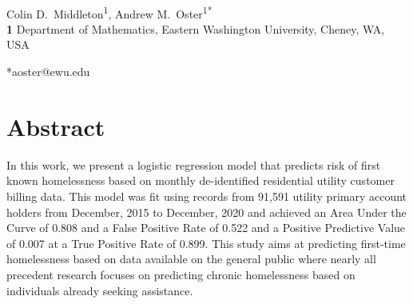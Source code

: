 \documentclass[10pt,letterpaper]{article}
\begin{document}
\vspace*{0.2in}

\begin{flushleft}
{\Large
\textbf{} %
}
\newline
\\
Colin D.\ Middleton\textsuperscript{1},
Andrew M.\ Oster\textsuperscript{1*} \\
\bigskip
\textbf{1} Department of Mathematics, Eastern Washington University, Cheney, WA, USA
\\

\bigskip





*aoster@ewu.edu

\end{flushleft}
\section*{Abstract}
In this work, we present a logistic regression model that predicts risk of first known homelessness based on monthly de-identified residential utility customer billing data. This model was fit using records from 91,591 utility primary account holders from December, 2015 to December, 2020 and achieved an Area Under the Curve of 0.808 and a False Positive Rate of 0.522 and a Positive Predictive Value of 0.007 at a True Positive Rate of 0.899. This study aims at predicting first-time homelessness based on data available on the general public where nearly all precedent research focuses on predicting chronic homelessness based on individuals already seeking assistance.
\end{document}
